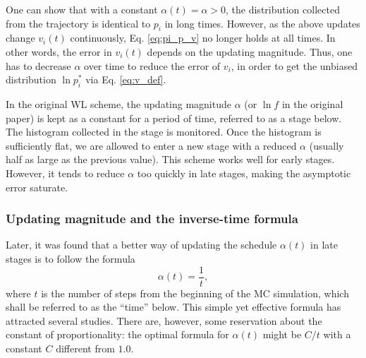 \documentclass[reprint, floatfix]{revtex4-1}
\begin{document}
One can show that with a constant $\alpha(t) = \alpha > 0$,
the distribution collected from
the trajectory is identical to $p_i$ in long times.
%
However, as the above updates
change $v_i(t)$ continuously,
Eq. \eqref{eq:pi_p_v} no longer holds
at all times.
%
In other words,
the error in $v_i(t)$
depends on the updating magnitude\cite{
  zhou2005, liang2005, laio2005, bussi2006, poulain2006, liang2007,
  morozov2007, zhou2008, morozov2009, crespo2010,
  atchade2011, fort2015}.
%
Thus, one has to decrease $\alpha$ over time
to reduce the error of $v_i$,
in order to get the unbiased distribution
$\ln p_i^*$ via Eq. \eqref{eq:v_def}.





In the original WL scheme,
the updating magnitude $\alpha$ (or $\ln f$
in the original paper) is kept as a constant
for a period of time,
referred to as a stage below.
%
The histogram collected in the stage is monitored.
%
Once the histogram is sufficiently flat,
we are allowed to enter a new stage
with a reduced $\alpha$\cite{wang2001, wang2001pre}
(usually half as large as
the previous value).
%
This scheme works well for early stages.
%
However, it tends to reduce $\alpha$
too quickly in late stages, making the asymptotic error
saturate\cite{belardinelli2007, belardinelli2007jcp, belardinelli2008}.
%




\subsubsection{Updating magnitude and the inverse-time formula}



Later,
it was found that
a better way
of updating the schedule $\alpha(t)$
in late stages
is to follow the formula
%
\begin{equation}
  \alpha(t) = \frac{1}{t},
  \label{eq:alpha_invt}
\end{equation}
%
where $t$ is the number of steps
from the beginning of the MC simulation,
which shall be referred to as the ``time'' below.
%
This simple yet effective formula has attracted
several studies\cite{belardinelli2007, belardinelli2007jcp, belardinelli2008,
morozov2007, zhou2008, morozov2009,
komura2012, caparica2012, caparica2014}.
%
There are, however, some reservation about
the constant of proportionality:
the optimal formula for $\alpha(t)$
might be $C/t$ with a constant $C$
different from $1.0$\cite{
morozov2007, zhou2008, morozov2009}.
\end{document}
